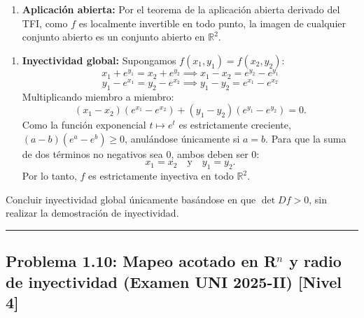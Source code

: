 \documentclass[11pt,a4paper]{article}
\begin{document}
\begin{enumerate}[label=\textbf{\arabic*.}]
\item \textbf{Aplicación abierta:}
Por el teorema de la aplicación abierta derivado del TFI, como $f$ es localmente invertible en todo punto, la imagen de cualquier conjunto abierto es un conjunto abierto en $\mathbb{R}^2$.
\end{enumerate}

\begin{enumerate}[label=\textbf{\arabic*.}]
\item \textbf{Inyectividad global:}
Supongamos $f(x_1, y_1) = f(x_2, y_2)$:
\begin{equation*}
x_1 + e^{y_1} = x_2 + e^{y_2} \implies x_1 - x_2 = e^{y_2} - e^{y_1}
\end{equation*}
\begin{equation*}
y_1 - e^{x_1} = y_2 - e^{x_2} \implies y_1 - y_2 = e^{x_1} - e^{x_2}
\end{equation*}
Multiplicando miembro a miembro:
\begin{equation*}
(x_1 - x_2)(e^{x_1} - e^{x_2}) + (y_1 - y_2)(e^{y_1} - e^{y_2}) = 0.
\end{equation*}
Como la función exponencial $t \mapsto e^t$ es estrictamente creciente, $(a - b)(e^a - e^b) \ge 0$, anulándose únicamente si $a = b$.
Para que la suma de dos términos no negativos sea 0, ambos deben ser 0:
\begin{equation*}
x_1 = x_2 \quad \text{y} \quad y_1 = y_2.
\end{equation*}
Por lo tanto, $f$ es estrictamente inyectiva en todo $\mathbb{R}^2$.
\end{enumerate}

\begin{trapbox}
Concluir inyectividad global únicamente basándose en que $\det Df > 0$, sin realizar la demostración de inyectividad.
\end{trapbox}

\vspace{0.5cm}
\hrule
\vspace{0.5cm}

\subsection*{Problema 1.10: Mapeo acotado en R$^n$ y radio de inyectividad (Examen UNI 2025-II) \hfill \color{primaryblue}\small[Nivel 4]}
\end{document}
